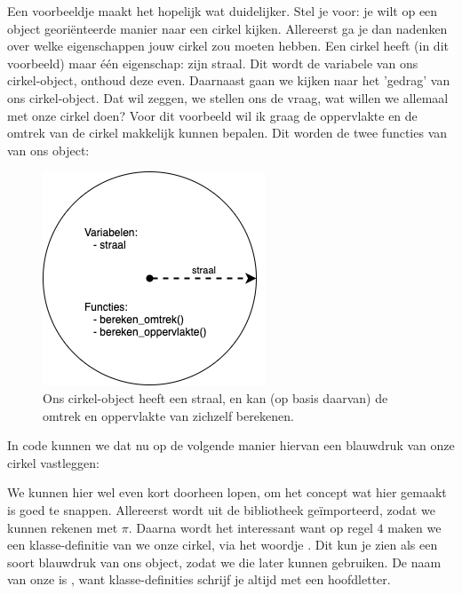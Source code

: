 Een voorbeeldje maakt het hopelijk wat duidelijker. Stel je voor: je wilt op een object georiënteerde manier naar een cirkel kijken. Allereerst ga je dan nadenken over welke eigenschappen jouw cirkel zou moeten hebben. Een cirkel heeft (in dit voorbeeld) maar één eigenschap: zijn straal. Dit wordt de variabele van ons cirkel-object, onthoud deze even. 
\newpage
Daarnaast gaan we kijken naar het 'gedrag' van ons cirkel-object. Dat wil zeggen, we stellen ons de vraag, wat willen we allemaal met onze cirkel doen? Voor dit voorbeeld wil ik graag de oppervlakte en de omtrek van de cirkel makkelijk kunnen bepalen. Dit worden de twee functies van van ons object: 
\begin{figure}[!ht]
\centering\includegraphics[scale=0.75]{Pictures/chapter07/cirkel.png}
\caption{Ons cirkel-object heeft een straal, en kan (op basis daarvan) de omtrek en oppervlakte van zichzelf berekenen.} 
\label{fig:cirkel} %
\end{figure}

In code kunnen we dat nu op de volgende manier hiervan een blauwdruk van onze cirkel vastleggen:


We kunnen hier wel even kort doorheen lopen, om het concept wat hier gemaakt is goed te snappen. Allereerst wordt uit de  bibliotheek  geïmporteerd, zodat we kunnen rekenen met $\pi$. Daarna wordt het interessant want op regel $4$ maken we een klasse-definitie van we onze cirkel, via het woordje . Dit kun je zien als een soort blauwdruk van ons object, zodat we die later kunnen gebruiken. De naam van onze  is , want klasse-definities schrijf je altijd met een hoofdletter. 

